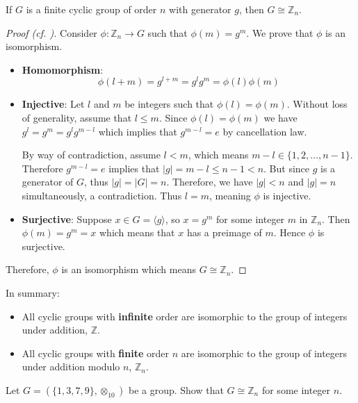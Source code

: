 \begin{theorem}\label{thrm-finite-cyclic-group-isomorphic-to-Zn}
    If $G$ is a finite cyclic group of order $n$ with generator $g$, then $G \cong \mathbb{Z}_n$.
\end{theorem}
\begin{proof}[Proof (cf. {\cite[\S 63]{clark_1984}})]
    Consider $\phi: \mathbb{Z}_n \to G$ such that $\phi(m) = g^m$. We prove that $\phi$ is an isomorphism.
    \begin{itemize}
        \item \textbf{Homomorphism}:
        \[
            \phi(l+m) = g^{l+m} = g^lg^m = \phi(l)\phi(m)
        \]

        \item \textbf{Injective}: Let $l$ and $m$ be integers such that $\phi(l) = \phi(m)$. Without loss of generality, assume that $l \leq m$. Since $\phi(l) = \phi(m)$ we have $g^l = g^m = g^lg^{m-l}$ which implies that $g^{m-l} = e$ by cancellation law.

        By way of contradiction, assume $l < m$, which means $m - l \in \{1, 2,\dots, n-1\}$. Therefore $g^{m-l} = e$ implies that $|g| = m-l \leq n - 1 < n$. But since $g$ is a generator of $G$, thus $|g| = |G| = n$. Therefore, we have $|g| < n$ and $|g| = n$ simultaneously, a contradiction. Thus $l = m$, meaning $\phi$ is injective.

        \item \textbf{Surjective}: Suppose $x \in G = \langle g\rangle$, so $x = g^m$ for some integer $m$ in $\mathbb{Z}_n$. Then $\phi(m) = g^m = x$ which means that $x$ has a preimage of $m$. Hence $\phi$ is surjective.
    \end{itemize}

    Therefore, $\phi$ is an isomorphism which means $G \cong \mathbb{Z}_n$.
\end{proof}

In summary:
\begin{itemize}
    \item All cyclic groups with \textbf{infinite} order are isomorphic to the group of integers under addition, $\mathbb{Z}$.
    \item All cyclic groups with \textbf{finite} order $n$ are isomorphic to the group of integers under addition modulo $n$, $\mathbb{Z}_n$.
\end{itemize}

\begin{exercise}
    Let $G = (\{1, 3, 7, 9\}, \otimes_{10})$ be a group. Show that $G \cong \mathbb{Z}_n$ for some integer $n$.
\end{exercise}

